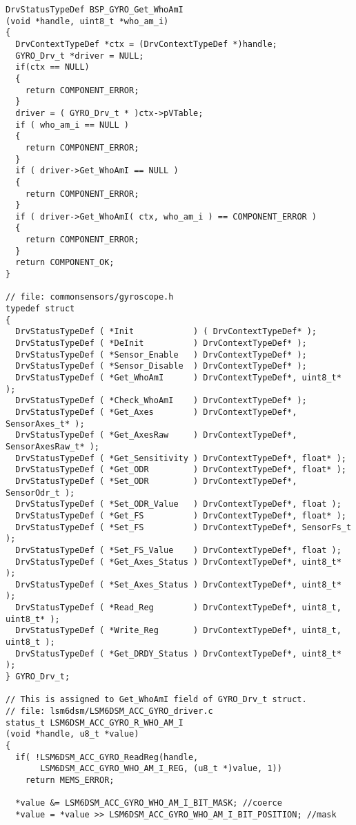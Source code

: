 \documentclass[times, utf8, diplomski]{diplomski}
\begin{document}
\begin{lstlisting}[caption={Primjer geneririranog koda kojeg generira Stm32CUBE IDE}, label={badcode}, basicstyle={\ttfamily\footnotesize\tiny}]
DrvStatusTypeDef BSP_GYRO_Get_WhoAmI
(void *handle, uint8_t *who_am_i)
{
  DrvContextTypeDef *ctx = (DrvContextTypeDef *)handle;
  GYRO_Drv_t *driver = NULL;
  if(ctx == NULL)
  {
    return COMPONENT_ERROR;
  }
  driver = ( GYRO_Drv_t * )ctx->pVTable;
  if ( who_am_i == NULL )
  {
    return COMPONENT_ERROR;
  }
  if ( driver->Get_WhoAmI == NULL )
  {
    return COMPONENT_ERROR;
  }
  if ( driver->Get_WhoAmI( ctx, who_am_i ) == COMPONENT_ERROR )
  {
    return COMPONENT_ERROR;
  }
  return COMPONENT_OK;
}

// file: commonsensors/gyroscope.h
typedef struct
{
  DrvStatusTypeDef ( *Init            ) ( DrvContextTypeDef* );
  DrvStatusTypeDef ( *DeInit          ) DrvContextTypeDef* );
  DrvStatusTypeDef ( *Sensor_Enable   ) DrvContextTypeDef* );
  DrvStatusTypeDef ( *Sensor_Disable  ) DrvContextTypeDef* );
  DrvStatusTypeDef ( *Get_WhoAmI      ) DrvContextTypeDef*, uint8_t* );
  DrvStatusTypeDef ( *Check_WhoAmI    ) DrvContextTypeDef* );
  DrvStatusTypeDef ( *Get_Axes        ) DrvContextTypeDef*, SensorAxes_t* );
  DrvStatusTypeDef ( *Get_AxesRaw     ) DrvContextTypeDef*, SensorAxesRaw_t* );
  DrvStatusTypeDef ( *Get_Sensitivity ) DrvContextTypeDef*, float* );
  DrvStatusTypeDef ( *Get_ODR         ) DrvContextTypeDef*, float* );
  DrvStatusTypeDef ( *Set_ODR         ) DrvContextTypeDef*, SensorOdr_t );
  DrvStatusTypeDef ( *Set_ODR_Value   ) DrvContextTypeDef*, float );
  DrvStatusTypeDef ( *Get_FS          ) DrvContextTypeDef*, float* );
  DrvStatusTypeDef ( *Set_FS          ) DrvContextTypeDef*, SensorFs_t );
  DrvStatusTypeDef ( *Set_FS_Value    ) DrvContextTypeDef*, float );
  DrvStatusTypeDef ( *Get_Axes_Status ) DrvContextTypeDef*, uint8_t* );
  DrvStatusTypeDef ( *Set_Axes_Status ) DrvContextTypeDef*, uint8_t* );
  DrvStatusTypeDef ( *Read_Reg        ) DrvContextTypeDef*, uint8_t, uint8_t* );
  DrvStatusTypeDef ( *Write_Reg       ) DrvContextTypeDef*, uint8_t, uint8_t );
  DrvStatusTypeDef ( *Get_DRDY_Status ) DrvContextTypeDef*, uint8_t* );
} GYRO_Drv_t;

// This is assigned to Get_WhoAmI field of GYRO_Drv_t struct.
// file: lsm6dsm/LSM6DSM_ACC_GYRO_driver.c
status_t LSM6DSM_ACC_GYRO_R_WHO_AM_I
(void *handle, u8_t *value)
{
  if( !LSM6DSM_ACC_GYRO_ReadReg(handle, 
       LSM6DSM_ACC_GYRO_WHO_AM_I_REG, (u8_t *)value, 1))
    return MEMS_ERROR;

  *value &= LSM6DSM_ACC_GYRO_WHO_AM_I_BIT_MASK; //coerce
  *value = *value >> LSM6DSM_ACC_GYRO_WHO_AM_I_BIT_POSITION; //mask


\end{lstlisting}
\end{document}
